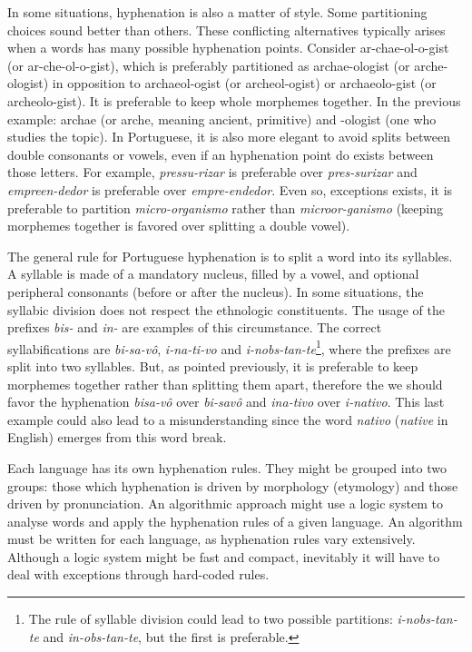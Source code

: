 \documentclass{article}
\begin{document}
In some situations, hyphenation is also a matter of style. Some partitioning
choices sound better than others. These conflicting alternatives typically
arises when a words has many possible hyphenation points. Consider
ar-chae-ol-o-gist (or ar-che-ol-o-gist), which is preferably partitioned as
archae-ologist (or arche-ologist) in opposition to archaeol-ogist (or
archeol-ogist) or archaeolo-gist (or archeolo-gist). It is preferable to keep
whole morphemes together. In the previous example: archae (or arche, meaning
ancient, primitive)
and -ologist (one who studies the topic). In Portuguese, it is also more
elegant to avoid splits between double consonants or vowels, even if an
hyphenation point do exists between those letters. For example,
\emph{pressu-rizar} is preferable over \emph{pres-surizar} and
\emph{empreen-dedor} is preferable over \emph{empre-endedor}. Even so,
exceptions exists, it is preferable to partition \emph{micro-organismo}
rather than \emph{microor-ganismo} (keeping morphemes together is favored
over splitting a double vowel).

The general rule for Portuguese hyphenation is to split a word into its
syllables. A syllable is made of a mandatory nucleus, filled by a vowel, and
optional peripheral consonants (before or after the nucleus). In some
situations, the syllabic division does not respect the ethnologic constituents.
The usage of the prefixes \emph{bis-} and \emph{in-} are examples of this
circumstance. The correct syllabifications are \emph{bi-sa-vô},
\emph{i-na-ti-vo} and \emph{i-nobs-tan-te}\footnote{The rule of syllable
division could lead to two possible partitions: \emph{i-nobs-tan-te} and
\emph{in-obs-tan-te}, but the first is preferable.}, where the prefixes are
split into two syllables. But, as pointed previously, it is preferable to keep
morphemes together rather than splitting them apart, therefore the we should
favor the hyphenation \emph{bisa-vô} over \emph{bi-savô} and \emph{ina-tivo}
over \emph{i-nativo}. This last example could also lead to a misunderstanding
since the word \emph{nativo} (\emph{native} in English) emerges from this word
break. 

Each language has its own hyphenation rules. They might be grouped into two
groups: those which hyphenation is driven by morphology (etymology) and those
driven by pronunciation. An algorithmic approach might use a logic system to
analyse words and apply the hyphenation rules of a given language. An algorithm
must be written for each language, as hyphenation rules vary extensively.
Although a logic system might be fast and compact, inevitably it will have to
deal with exceptions through hard-coded rules.
\end{document}
